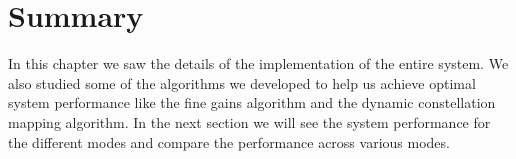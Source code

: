 \section*{Summary}
In this chapter we saw the details of the implementation of the entire system. We also studied some of the algorithms we developed to help us achieve optimal system performance like the fine gains algorithm and the dynamic constellation mapping algorithm. In the next section we will see the system performance for the different modes and compare the performance across various modes.

